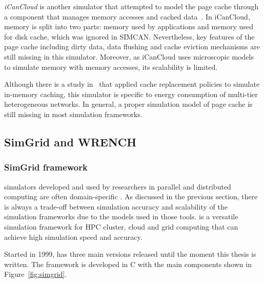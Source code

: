 \textit{iCanCloud} is another simulator that attempted to model the page cache 
through a component that manages memory accesses and cached 
data~\cite{nunez2012icancloud}. 
In iCanCloud, memory is split into two parts: memory used by applications 
and memory used for disk cache, which was ignored in SIMCAN. 
Nevertheless, key features of the page cache including dirty data, 
data flushing and cache eviction mechanisms are still missing 
in this simulator.
Moreover, as iCanCloud uses microscopic models to simulate memory 
with memory accesses, its scalability is limited. 

Although there is a study in~\cite{xu2018saving} that applied cache 
replacement policies to simulate in-memory caching, this simulator 
is specific to energy consumption of multi-tier heterogeneous networks.
In general, a proper simulation model of page cache is still missing 
in most simulation frameworks.

\subsection{SimGrid and WRENCH}

\subsubsection{SimGrid framework}

 simulators developed and used by researchers in 
parallel and distributed computing are often domain-specific 
\cite{casanova2014simgrid}.
As discussed in the previous section, there is always a trade-off between 
simulation accuracy and scalability of the simulation frameworks due 
to the models used in those tools. 
\simgrid is a versatile simulation framework for HPC cluster, cloud and 
grid computing that can achieve high simulation speed and accuracy.

Started in 1999, \simgrid has three main versions released until the moment 
this thesis is written. 
The \simgrid framework is developed in C with the main components shown in 
Figure~\ref{fig:simgrid}.

